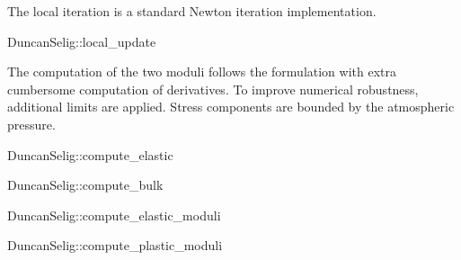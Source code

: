 The local iteration is a standard Newton iteration implementation.
\begin{cppcode}
DuncanSelig::local_update
\end{cppcode}

The computation of the two moduli follows the formulation with extra cumbersome computation of derivatives.
To improve numerical robustness, additional limits are applied.
Stress components are bounded by the atmospheric pressure.
\begin{cppcode}
DuncanSelig::compute_elastic
\end{cppcode}

\begin{cppcode}
DuncanSelig::compute_bulk
\end{cppcode}

\begin{cppcode}
DuncanSelig::compute_elastic_moduli
\end{cppcode}

\begin{cppcode}
DuncanSelig::compute_plastic_moduli
\end{cppcode}